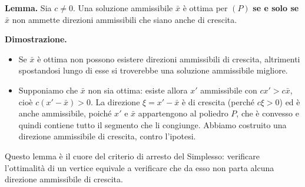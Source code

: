 \documentclass[12pt]{extarticle} %
\begin{document}
\noindent\textbf{Lemma.} Sia $c \ne 0$. Una soluzione ammissibile $\bar{x}$ è ottima per $(P)$ \textbf{se e solo se} $\bar{x}$ non ammette direzioni ammissibili che siano anche di crescita.

\noindent\textbf{Dimostrazione.}
\begin{itemize}
    \item[$\implies$] Se $\bar{x}$ è ottima non possono esistere direzioni ammissibili di crescita, altrimenti spostandosi lungo di esse si troverebbe una soluzione ammissibile migliore.
    \item[$\impliedby$] Supponiamo che $\bar{x}$ non sia ottima: esiste allora $x'$ ammissibile con $cx' > c\bar{x}$, cioè $c(x'-\bar{x}) > 0$. La direzione $\xi = x' - \bar{x}$ è di crescita (perché $c\xi > 0$) ed è anche ammissibile, poiché $x'$ e $\bar{x}$ appartengono al poliedro $P$, che è convesso e quindi contiene tutto il segmento che li congiunge. Abbiamo costruito una direzione ammissibile di crescita, contro l'ipotesi.
\end{itemize}
Questo lemma è il cuore del criterio di arresto del Simplesso: verificare l'ottimalità di un vertice equivale a verificare che da esso non parta alcuna direzione ammissibile di crescita.
\end{document}

